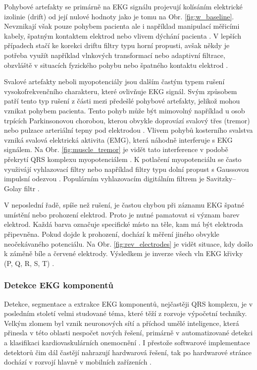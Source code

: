 Pohybové artefakty se primárně na EKG signálu projevují kolísáním elektrické
izolinie (drift) od její nulové hodnoty jako je tomu na Obr.
\ref{fig:w_baseline}. Nevznikají však pouze pohybem pacienta ale i například
manipulací měřicími kabely, špatným kontaktem elektrod nebo vlivem dýchání
pacienta \cite{Goldberger2017}. V lepších případech stačí ke korekci driftu
filtry typu horní propusti, avšak někdy je potřeba využít například vlnkových
transformací nebo adaptivní filtrace, obzvláště v situacích fyzického pohybu
nebo špatného kontaktu elektrod \cite{Kher2019}.

Svalové artefakty neboli myopotenciály jsou dalším častým typem rušení
vysokofrekvenčního charakteru, které ovlivňuje EKG signál. Svým způsobem patří
tento typ rušení z části mezi předešlé pohybové artefakty, jelikož mohou vznikat
pohybem pacienta. Tento pohyb může být mimovolný například u osob trpících
Parkinsonovou chorobou, kterou obvykle doprovází svalový třes (tremor) nebo
pulzace arteriální tepny pod elektrodou \cite{Surawicz2008}. Vlivem pohybů
kosterního svalstva vzniká svalová elektrická aktivita (EMG), která náhodně
interferuje s EKG signálem. Na Obr. \ref{fig:muscle_tremor} je vidět tato
interference v podobě překrytí QRS komplexu myopotenciálem
\cite{Goldberger2017}. K potlačení myopotenciálu se často využivájí vyhlazovací
filtry nebo například filtry typu dolní propust s Gaussovou impulsní odezvou
\cite{Kher2019}. Populárním vyhlazovacím digitálním filtrem je Savitzky–Golay
filtr \cite{Schafer2011}.

V neposlední řadě, spíše než rušení, je častou chybou při záznamu EKG špatné
umístění nebo prohození elektrod. Proto je nutné pamatovat si význam barev
elektrod. Každá barva označuje specifické místo na těle, kam má být elektroda
připevněna. Pokud dojde k prohození, dochází k měření jiného obvykle neočekávaného
potenciálu. Na Obr. \ref{fig:rev_electrodes} je vidět situace, kdy došlo k
záměně bíle a červené elektrody. Výsledkem je inverze všech vln EKG křivky (P,
Q, R, S, T) \cite{Goldberger2017,Surawicz2008}.

\subsubsection{Detekce EKG komponentů}
\label{section:components_detection_theory}
Detekce, segmentace a extrakce EKG komponentů, nejčastěji QRS komplexu, je v
posledním století velmi studované téma, které těží z rozvoje výpočetní techniky.
Velkým zlomem byl vznik neuronových sítí a příchod umělé inteligence,
která přinesla v této oblasti nespočet nových řešení, primárně v automatizované
detekci a klasifikaci kardiovaskulárních onemocnění \cite{Kashou2020}. I
přestože softwarové implementace detektorů čim dál častějí nahrazují hardwarová
řešení, tak po hardwarové stránce dochází v rozvojí hlavně v mobilních
zařízeních \cite{Kohler2002}.


